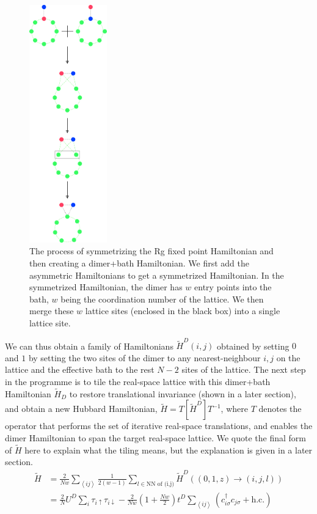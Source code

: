 \documentclass{article}
\numberwithin{equation}{section}
\begin{document}
\begin{figure}[htpb]
	\centering
	\includegraphics[width=0.3\textwidth]{dimer_bath.png}
	\caption{The process of symmetrizing the Rg fixed point Hamiltonian and then creating a dimer+bath Hamiltonian. We first add the asymmetric Hamiltonians to get a symmetrized Hamiltonian. In the symmetrized Hamiltonian, the dimer has \(w\) entry points into the bath, \(w\) being the coordination number of the lattice. We then merge these \(w\) lattice sites (enclosed in the black box) into a single lattice site.}
	\label{dimer-bath} 
\end{figure}
We  can thus obtain a family of Hamiltonians \(\tilde H^D(i,j)\) obtained by setting \(0\) and \(1\) by setting the two sites of the dimer to any nearest-neighbour \(i,j\) on the lattice and the effective bath to the rest \(N-2\) sites of the lattice. The next step in the programme is to tile the real-space lattice with this dimer+bath Hamiltonian \(\tilde H_D\) to restore translational invariance (shown in a later section), and obtain a new Hubbard Hamiltonian, $\tilde H = T\left[ \tilde H^{D} \right] T^{-1}$, where $T$ denotes the operator that performs the set of iterative real-space translations, and enables the dimer Hamiltonian to span the target real-space lattice. We quote the final form of $\tilde H$ here to explain what the tiling means, but the explanation is given in a later section.
\begin{equation}\begin{aligned}
	\tilde H &= \frac{2}{Nw}\sum_{\left<ij\right>}\frac{1}{2(w-1)}\sum_{l \in \text{NN of (i,j)}}\tilde H^D((0,1,z) \to (i, j, l))\\
		 &= \frac{2}{N}U^D\sum_{i} \tau_{i \uparrow}\tau_{i \downarrow} - \frac{2}{Nw}\left(1 + \frac{Nw}{2}\right)t^D\sum_{\left<ij\right>}\left(c^\dagger_{i\sigma}c_{j\sigma} + \text{h.c.}\right)
\end{aligned}\end{equation}
\end{document}
